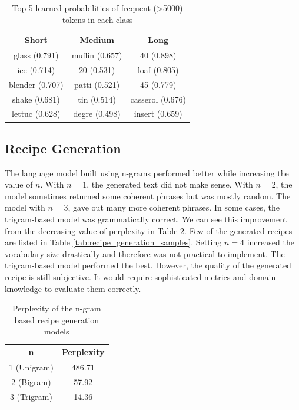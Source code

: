 \documentclass[sigconf]{acmart}
\begin{document}
\begin{table}[h]
\begin{tabular}{|c c c|}
    \hline Short & Medium & Long\\
    \hline\hline glass (0.791) & muffin (0.657) & 40 (0.898) \\
    \hline ice (0.714) & 20 (0.531) & loaf (0.805) \\
    \hline blender (0.707) & patti (0.521) & 45 (0.779) \\
    \hline shake (0.681) & tin (0.514) & casserol (0.676) \\
    \hline lettuc (0.628) & degre (0.498) & insert (0.659) \\
    \hline
\end{tabular}
\caption{Top 5 learned probabilities of frequent (>5000) tokens in each class}
\label{tab:cooking_duration_conditional_probability}
\end{table}

\subsection{Recipe Generation}
The language model built using n-grams performed better while increasing the value of $n$. With $n = 1$, the generated text did not make sense. With $n = 2$, the model sometimes returned some coherent phrases but was mostly random. The model with $n = 3$, gave out many more coherent phrases. In some cases, the trigram-based model was grammatically correct. We can see this improvement from the decreasing value of perplexity in Table \ref{tab:recipe_generation_perplexity}. Few of the generated recipes are listed in Table \ref{tab:recipe_generation_samples}. Setting $n = 4$ increased the vocabulary size drastically and therefore was not practical to implement. The trigram-based model performed the best. However, the quality of the generated recipe is still subjective. It would require sophisticated metrics and domain knowledge to evaluate them correctly. 

\begin{table}[]
    \centering
    \begin{tabular}{|c|c|}
        \hline n & Perplexity \\
        \hline\hline 1 (Unigram) & 486.71\\
        \hline 2 (Bigram) & 57.92\\
        \hline 3 (Trigram) & 14.36\\
        \hline
    \end{tabular}
    \caption{Perplexity of the n-gram based recipe generation models}
    \label{tab:recipe_generation_perplexity}
\end{table}
\end{document}
